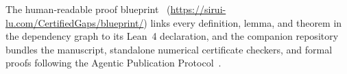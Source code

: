 The human-readable proof blueprint~\cite{Lu2026Blueprint}
(\url{https://sirui-lu.com/CertifiedGaps/blueprint/}) links every
definition, lemma, and theorem in the dependency graph to its Lean~4
declaration, and the companion repository~\cite{Lu2026CertifiedGaps}
bundles the manuscript, standalone numerical certificate checkers, and
formal proofs following the Agentic Publication Protocol~\cite{Lu2026APP}.

